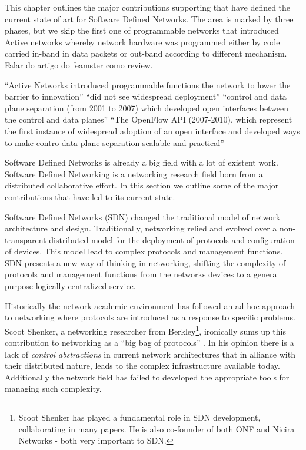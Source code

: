 \documentclass[12pt,openright,twoside]{report}
\title{\PEITITULO}
\author{\PEIAutor}
\begin{document}



This chapter outlines the major contributions supporting that have defined the current state of art for Software Defined Networks. 
The area is marked by three phases, but we skip the first one of programmable networks that introduced Active networks whereby network hardware was programmed either by code carried in-band in data packets or out-band according to different mechanism. 
Falar do artigo do feamster como review. 


``Active Networks introduced programmable functions the network to lower the barrier to innovation'' ``did not see widespread deployment''
``control and data plane separation (from 2001 to 2007) which developed open interfaces between the control and data planes'' 
``The OpenFlow API (2007-2010), which represent the first instance of widespread adoption of an open interface and developed ways to make contro-data plane separation scalable and practical'' 


Software Defined Networks is already a big field with a lot of existent work. 
Software Defined Networking is a networking research field born from a  distributed
collaborative effort. In this section we outline some of the major contributions that have led to its current state. 






Software Defined Networks (SDN) changed the traditional model of network architecture and design. 
Traditionally, networking  relied and evolved over a non-transparent distributed model for
the deployment  of  protocols and configuration of devices. 
This model lead to complex protocols and management functions. 
SDN presents a new way of thinking in networking, shifting the complexity of protocols and management functions from  the  networks devices to a general purpose logically centralized service. 

Historically  the network academic environment has followed an  ad-hoc approach to networking where protocols are introduced as a response to specific problems. 
Scoot Shenker, a networking researcher from Berkley\footnote{Scoot Shenker has played a fundamental role in SDN development, collaborating in many papers. He is also co-founder of both ONF \cite{onf} and Nicira Networks - both very important to SDN.}, ironically sums up  this contribution to networking as a ``big bag of protocols'' \cite{Shenker:2011ys}. 
In his opinion there is a lack of \emph{control abstractions} in current network architectures that in alliance  with  their  distributed nature, leads to the  complex infrastructure available today. 
Additionally the network field has failed to developed the appropriate tools for managing such complexity. 
\end{document}
